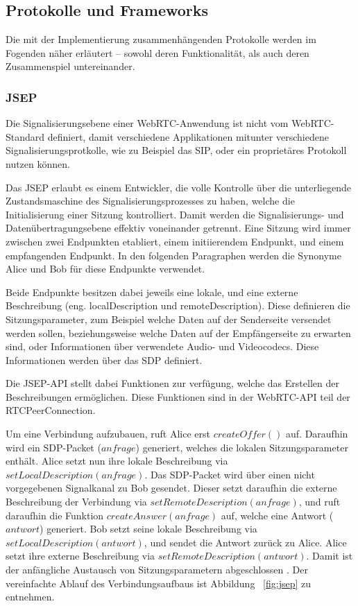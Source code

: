 \subsection{Protokolle und Frameworks}
Die mit der Implementierung zusammenhängenden Protokolle werden im Fogenden näher erläutert -- sowohl deren Funktionalität, als auch deren Zusammenspiel untereinander.\par

\subsubsection{JSEP}
Die Signalisierungsebene einer \acs{WebRTC}-Anwendung ist nicht vom \acs{WebRTC}-Standard definiert, damit verschiedene Applikationen mitunter verschiedene Signalisierungsprotkolle, wie zu Beispiel das \acf{SIP}, oder ein proprietäres Protokoll nutzen können.\par

Das \acf{JSEP} erlaubt es einem Entwickler, die volle Kontrolle über die unterliegende Zustandsmaschine des Signalisierungsprozesses zu haben, welche die Initialisierung einer Sitzung kontrolliert. Damit werden die Signalisierungs- und Datenübertragungsebene effektiv voneinander getrennt. Eine Sitzung wird immer zwischen zwei Endpunkten etabliert, einem initiierendem Endpunkt, und einem empfangenden Endpunkt. In den folgenden Paragraphen werden die Synonyme \glqq{}Alice\grqq{} und \glqq{}Bob\grqq{} für diese Endpunkte verwendet.\par

Beide Endpunkte besitzen dabei jeweils eine lokale, und eine externe Beschreibung (eng. \glqq{}localDescription\grqq{} und \glqq{}remoteDescription\grqq{}). Diese definieren die Sitzungsparameter, zum Beispiel welche Daten auf der Senderseite versendet werden sollen, beziehungsweise welche Daten auf der Empfängerseite zu erwarten sind, oder Informationen über verwendete Audio- und Videocodecs. Diese Informationen werden über das \acf{SDP} definiert.\par

Die \acs{JSEP}-\acs{API} stellt dabei Funktionen zur verfügung, welche das Erstellen der Beschreibungen ermöglichen. Diese Funktionen sind in der \acs{WebRTC}-\acs{API} teil der RTCPeerConnection.\par

Um eine Verbindung aufzubauen, ruft Alice erst $createOffer()$ auf. Daraufhin wird ein SDP-Packet ($anfrage$) generiert, welches die lokalen Sitzungsparameter enthält. Alice setzt nun ihre lokale Beschreibung via $setLocalDescription(anfrage)$. Das \acs{SDP}-Packet wird über einen nicht vorgegebenen Signalkanal zu Bob gesendet. Dieser setzt daraufhin die externe Beschreibung der Verbindung via $setRemoteDescription(anfrage)$, und ruft daraufhin die Funktion $createAnswer(anfrage)$ auf, welche eine Antwort ($antwort$) generiert. Bob setzt seine lokale Beschreibung via $setLocalDescription(antwort)$, und sendet die Antwort zurück zu Alice. Alice setzt ihre externe Beschreibung via $setRemoteDescription(antwort)$. Damit ist der anfängliche Austausch von Sitzungsparametern abgeschlossen \cite{altanai2014}.
Der vereinfachte Ablauf des Verbindungsaufbaus ist Abbildung ~\ref{fig:jsep} zu entnehmen.

